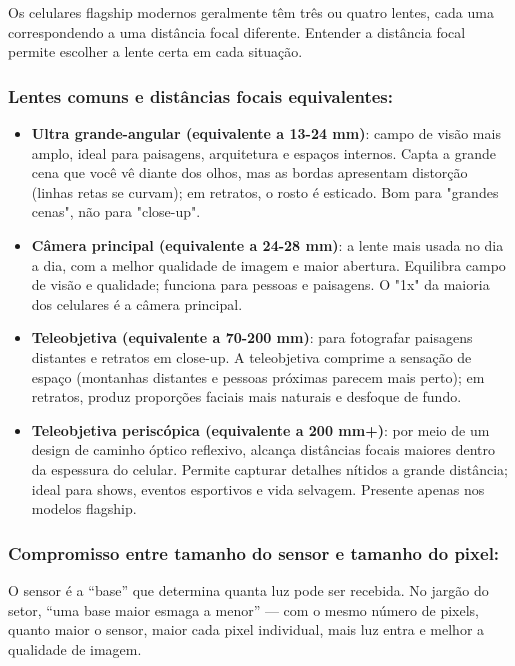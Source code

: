 
Os celulares flagship modernos geralmente têm três ou quatro lentes, cada uma correspondendo a uma distância focal diferente. Entender a distância focal permite escolher a lente certa em cada situação.

\subsubsection*{Lentes comuns e distâncias focais equivalentes:}

\begin{itemize}
  \item \textbf{Ultra grande-angular (equivalente a 13-24 mm)}: campo de visão mais amplo, ideal para paisagens, arquitetura e espaços internos. Capta a grande cena que você vê diante dos olhos, mas as bordas apresentam distorção (linhas retas se curvam); em retratos, o rosto é esticado. Bom para "grandes cenas", não para "close-up".
  \item \textbf{Câmera principal (equivalente a 24-28 mm)}: a lente mais usada no dia a dia, com a melhor qualidade de imagem e maior abertura. Equilibra campo de visão e qualidade; funciona para pessoas e paisagens. O "1x" da maioria dos celulares é a câmera principal.
  \item \textbf{Teleobjetiva (equivalente a 70-200 mm)}: para fotografar paisagens distantes e retratos em close-up. A teleobjetiva comprime a sensação de espaço (montanhas distantes e pessoas próximas parecem mais perto); em retratos, produz proporções faciais mais naturais e desfoque de fundo.
  \item \textbf{Teleobjetiva periscópica (equivalente a 200 mm+)}: por meio de um design de caminho óptico reflexivo, alcança distâncias focais maiores dentro da espessura do celular. Permite capturar detalhes nítidos a grande distância; ideal para shows, eventos esportivos e vida selvagem. Presente apenas nos modelos flagship.
\end{itemize}

\subsubsection*{Compromisso entre tamanho do sensor e tamanho do pixel:}

O sensor é a “base” que determina quanta luz pode ser recebida. No jargão do setor, “uma base maior esmaga a menor” — com o mesmo número de pixels, quanto maior o sensor, maior cada pixel individual, mais luz entra e melhor a qualidade de imagem.

